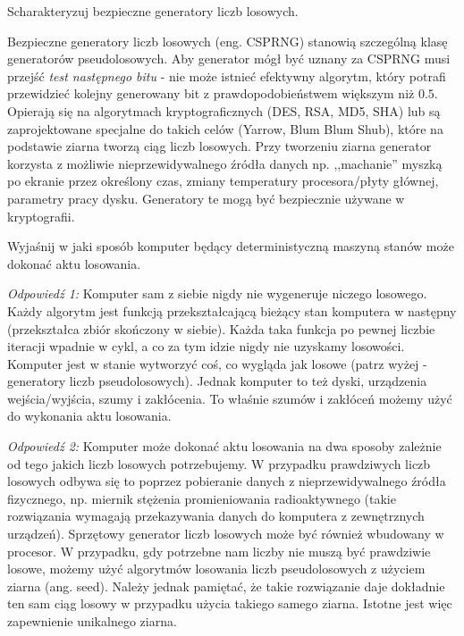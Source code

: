 \documentclass[answers,11pt]{exam}
\begin{document}
\begin{questions}
\question Scharakteryzuj bezpieczne generatory liczb losowych.
\begin{solution}
Bezpieczne generatory liczb losowych (eng. CSPRNG) stanowią szczególną klasę generatorów pseudolosowych. Aby generator mógł być uznany za CSPRNG musi przejść \textit{test następnego bitu} - nie może istnieć efektywny algorytm, który potrafi przewidzieć kolejny generowany bit z prawdopodobieństwem większym niż $0.5$. Opierają się na algorytmach kryptograficznych (DES, RSA, MD5, SHA) lub są zaprojektowane specjalne do takich celów (Yarrow, Blum Blum Shub), które na podstawie ziarna tworzą ciąg liczb losowych. Przy tworzeniu ziarna generator korzysta z możliwie nieprzewidywalnego źródła danych np. ,,machanie'' myszką po ekranie przez określony czas, zmiany temperatury procesora/płyty głównej, parametry pracy dysku. Generatory te mogą być bezpiecznie używane w kryptografii. 
\end{solution}


\question Wyjaśnij w jaki sposób komputer będący deterministyczną maszyną stanów może dokonać aktu losowania.
\begin{solution}

\textit{Odpowiedź 1:} Komputer sam z siebie nigdy nie wygeneruje niczego losowego. Każdy algorytm jest funkcją przekształcającą bieżący stan komputera w następny (przekształca zbiór skończony w siebie). Każda taka funkcja po pewnej liczbie iteracji wpadnie w cykl, a co za tym idzie nigdy nie uzyskamy losowości. Komputer jest w stanie wytworzyć coś, co wygląda jak losowe (patrz wyżej - generatory liczb pseudolosowych). Jednak komputer to też dyski, urządzenia wejścia/wyjścia, szumy i zakłócenia. To właśnie szumów i zakłóceń możemy użyć do wykonania aktu losowania.

\textit{Odpowiedź 2:} Komputer może dokonać aktu losowania na dwa sposoby zależnie od tego jakich liczb losowych potrzebujemy. W przypadku prawdziwych liczb losowych odbywa się to poprzez pobieranie danych z nieprzewidywalnego źródła fizycznego, np. miernik stężenia promieniowania radioaktywnego (takie rozwiązania wymagają przekazywania danych do komputera z zewnętrznych urządzeń). Sprzętowy generator liczb losowych może być również wbudowany w procesor. W przypadku, gdy potrzebne nam liczby nie muszą być prawdziwie losowe, możemy użyć algorytmów losowania liczb pseudolosowych z użyciem ziarna (ang. seed). Należy jednak pamiętać, że takie rozwiązanie daje dokładnie ten sam ciąg losowy w przypadku użycia takiego samego ziarna. Istotne jest więc zapewnienie unikalnego ziarna.


\end{solution}
\end{questions}
\end{document}
